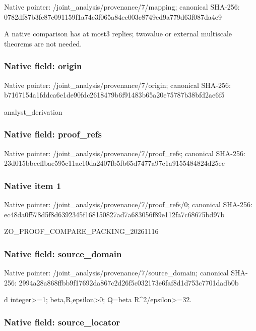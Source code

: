 \documentclass[10pt,a4paper]{article}
\begin{document}
Native pointer: /joint\_analysis/provenance/7/mapping; canonical SHA-256: 0782df87b3fe87c091159f1a\allowbreak{}74c3f065a84ec003c8749ed9\allowbreak{}a779d63f087da4e9


A native comparison has at most3 replies; twovalue or external multiscale theorems are not needed.


\subsubsection{Native field: origin}


Native pointer: /joint\_analysis/provenance/7/origin; canonical SHA-256: b7167154a1fddca6e1de90fd\allowbreak{}c2618479b6f91483b65a20e7\allowbreak{}5787b38bfd2ae6f5


analyst\_derivation


\subsubsection{Native field: proof\_refs}


Native pointer: /joint\_analysis/provenance/7/proof\_refs; canonical SHA-256: 23d015bbceffbae595c11ac1\allowbreak{}0da2407fb5fb65d7477a97c1\allowbreak{}a9155484824d25ec



\subsubsection{Native item 1}


Native pointer: /joint\_analysis/provenan\allowbreak{}ce/7/proof\_refs/0; canonical SHA-256: ec48da0f578d5f8d6392345f\allowbreak{}168150827ad7a683056f89e1\allowbreak{}12fa7c68675bd97b


ZO\_PROOF\_COMPARE\_PACKING\_20261116


\subsubsection{Native field: source\_domain}


Native pointer: /joint\_analysis/provenan\allowbreak{}ce/7/source\_domain; canonical SHA-256: 2994a28a868ffbb9f17692da\allowbreak{}867c2d26f5c032173e6faf8d\allowbreak{}1d753c7701dadb0b


d integer>=1; beta,R,epsilon>0; Q=beta R\textasciicircum{}2/epsilon>=32.


\subsubsection{Native field: source\_locator}
\end{document}
